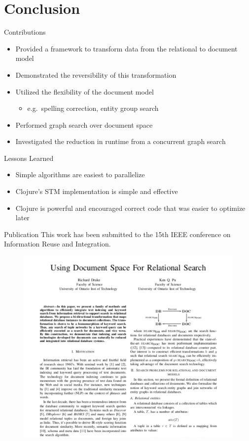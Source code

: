 \documentclass[compress]{beamer}
\begin{document}
	\section{Conclusion}
		\begin{frame}{Contributions}
			\begin{itemize}
				\item Provided a framework to transform data from the relational to document model
				\item Demonstrated the reversibility of this transformation
				\item Utilized the flexibility of the document model
					\begin{itemize}
						\item e.g.~spelling correction, entity group search
					\end{itemize}
				\item Performed graph search over document space
				\item Investigated the reduction in runtime from a concurrent graph search
			\end{itemize}
		\end{frame}
		
		\begin{frame}{Lessons Learned}
			\begin{itemize}
				\item Simple algorithms are easiest to parallelize
				\item Clojure's STM implementation is simple and effective
				\item Clojure is powerful and encouraged correct code that was easier to optimize later
			\end{itemize}
		\end{frame}
		
		\begin{frame}{Publication}
			This work has been submitted to the 15th IEEE conference on Information Reuse and Integration.

			\begin{figure}
				\centering
				\includegraphics[scale=0.3]{paper-thumbnail}
			\end{figure}
		\end{frame}
		
\end{document}
